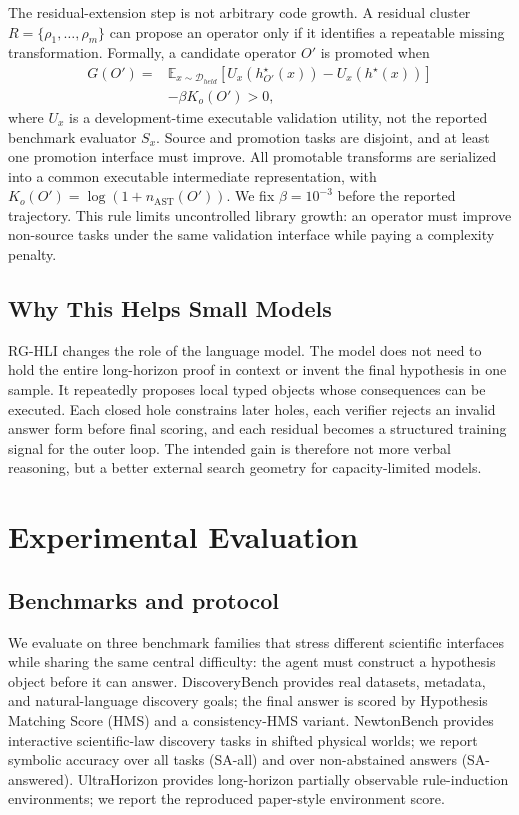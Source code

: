 \documentclass[letterpaper]{article}
\newcommand{\methodshort}{\textsc{RG-HLI}\xspace}
\begin{document}
The residual-extension step is not arbitrary code growth. A residual cluster
$R=\{\rho_1,\ldots,\rho_m\}$ can propose an operator only if it identifies a
repeatable missing transformation. Formally, a candidate operator $O'$ is
promoted when
\begin{equation}
\begin{aligned}
  G(O') ={}&
  \mathbb{E}_{x\sim\mathcal{D}_{held}}
  [U_x(h^\star_{O'}(x))-U_x(h^\star(x))] \\
  &-\beta K_o(O') > 0,
\end{aligned}
\label{eq:promotion}
\end{equation}
where $U_x$ is a development-time executable validation utility, not the
reported benchmark evaluator $S_x$. Source and promotion tasks are disjoint,
and at least one promotion interface must improve. All promotable transforms
are serialized into a common executable intermediate representation, with
$K_o(O')=\log(1+n_{\mathrm{AST}}(O'))$. We fix $\beta=10^{-3}$ before the
reported trajectory. This rule limits uncontrolled library growth: an operator
must improve non-source tasks under the same validation interface while paying
a complexity penalty.

\subsection{Why This Helps Small Models}

\methodshort changes the role of the language model. The model does not need to hold
the entire long-horizon proof in context or invent the final hypothesis in one
sample. It repeatedly proposes local typed objects whose consequences can be
executed. Each closed hole constrains later holes, each verifier rejects an
invalid answer form before final scoring, and each residual becomes a structured
training signal for the outer loop. The intended gain is therefore not more
 verbal reasoning, but a better external search geometry for capacity-limited models.

\section{Experimental Evaluation}

\subsection{Benchmarks and protocol}

We evaluate on three benchmark families that stress different scientific
interfaces while sharing the same central difficulty: the agent must construct
a hypothesis object before it can answer. DiscoveryBench provides real
datasets, metadata, and natural-language discovery goals; the final answer is
scored by Hypothesis Matching Score (HMS) and a consistency-HMS variant.
NewtonBench provides interactive scientific-law discovery tasks in shifted
physical worlds; we report symbolic accuracy over all tasks (SA-all) and over
non-abstained answers (SA-answered). UltraHorizon provides long-horizon
partially observable rule-induction environments; we report the reproduced
paper-style environment score.
\end{document}
